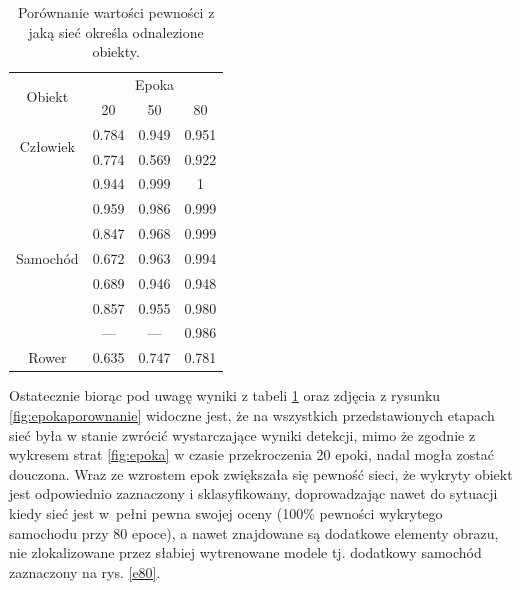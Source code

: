\begin{table}[H]
    \centering
    \caption{Porównanie wartości pewności z jaką sieć określa odnalezione obiekty.}
    \begin{tabular}{|c||c|c|c|}
    \hline
    \multirow{2}{*}{Obiekt}&\multicolumn{3}{|c|}{Epoka} \\ \cline{2-4}
    &20&50&80 \\ \hline
    \multirow{2}{*}{Człowiek} & 0.784 & 0.949 & 0.951 \\ \cline{2-4}
    & 0.774 & 0.569 & 0.922 \\ \hline
    \multirow{7}{*}{Samochód} & 0.944 & 0.999 & 1 \\ \cline{2-4}
    & 0.959 & 0.986 & 0.999 \\ \cline{2-4}
    & 0.847 & 0.968 & 0.999 \\ \cline{2-4}
    & 0.672 & 0.963 & 0.994 \\ \cline{2-4}
    & 0.689 & 0.946 & 0.948 \\ \cline{2-4}    
    & 0.857 & 0.955 & 0.980 \\ \cline{2-4}
    & --- & --- & 0.986 \\ \hline
    Rower & 0.635 & 0.747 & 0.781 \\
    \hline
    \end{tabular}
    \label{tab:prawdopodobienstwo}
\end{table}

\hspace{0.5cm}
Ostatecznie biorąc pod uwagę wyniki z tabeli \ref{tab:prawdopodobienstwo} oraz zdjęcia z rysunku \ref{fig:epokaporownanie} widoczne jest, że na wszystkich przedstawionych etapach sieć była w stanie zwrócić wystarczające wyniki detekcji, mimo że zgodnie z wykresem strat \ref{fig:epoka} w czasie przekroczenia 20 epoki, nadal mogła zostać douczona. Wraz ze wzrostem epok zwiększała się pewność sieci, że wykryty obiekt jest odpowiednio zaznaczony i sklasyfikowany, doprowadzając nawet do sytuacji kiedy sieć jest w~pełni pewna swojej oceny (100\% pewności wykrytego samochodu przy 80 epoce), a nawet znajdowane są dodatkowe elementy obrazu, nie zlokalizowane przez słabiej wytrenowane modele tj. dodatkowy samochód zaznaczony na rys. \ref{e80}.



